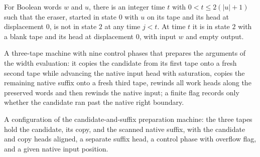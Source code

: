 \begin{lemma}
\label{Turing.FinTM.emitterP2_erase_first}
\leanok
{}
For Boolean words $w$ and $u$, there is an integer time $t$ with $0<t\le 2(|u|+1)$ such
that the eraser, started in state $0$ with $u$ on its tape and its head at displacement
$0$, is not in state $2$ at any time $j<t$. At time $t$ it is in state $2$ with a blank
tape and its head at displacement $0$, with input $w$ and empty output.
\end{lemma}

\begin{definition}
\label{Turing.FinTM.emitterP2PrepareTM}
\leanok
{}
A three-tape machine with nine control phases that prepares the arguments of
the width evaluation: it copies the candidate from its first tape onto a
fresh second tape while advancing the native input head with saturation,
copies the remaining native suffix onto a fresh third tape, rewinds all
work heads along the preserved words and then rewinds the native input; a
finite flag records only whether the candidate ran past the native right
boundary.
\end{definition}

\begin{definition}
\label{Turing.FinTM.emitterP2PrepareCfg}
\leanok
{}
A configuration of the candidate-and-suffix preparation machine: the three
tapes hold the candidate, its copy, and the scanned native suffix, with the
candidate and copy heads aligned, a separate suffix head, a control phase
with overflow flag, and a given native input position.
\end{definition}

